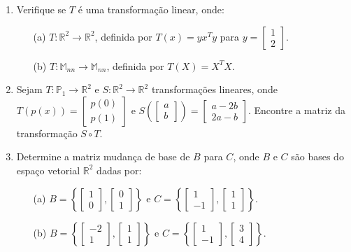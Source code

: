 \documentclass[a4paper,12pt]{article}
\begin{document}
\begin{enumerate}
\item Verifique se $T$ é uma transformação linear, onde:
\begin{enumerate}
    \item[(a)] $T: \mathbb{R}^2 \to \mathbb{R}^2$, definida por $T(x) = yx^Ty$ para $y = \begin{bmatrix} 1 \\ 2 \end{bmatrix}$.
    \item[(b)] $T: \mathbb{M}_{nn} \to \mathbb{M}_{nn}$, definida por $T(X) = X^TX$.
\end{enumerate}
\item Sejam $T: \mathbb{P}_1 \to \mathbb{R}^2$ e $S: \mathbb{R}^2 \to \mathbb{R}^2$ transformações lineares, onde $T(p(x)) = \begin{bmatrix} p(0) \\ p(1) \end{bmatrix}$ e $S\left(\begin{bmatrix} a \\ b \end{bmatrix}\right) = \begin{bmatrix} a - 2b \\ 2a - b \end{bmatrix}$. Encontre a matriz da transformação $S \circ T$.

\item Determine a matriz mudança de base de $B$ para $C$, onde $B$ e $C$ são bases do espaço vetorial $\mathbb{R}^2$ dadas por:
\begin{enumerate}
    \item [(a)] $B = \left\{ \begin{bmatrix} 1 \\ 0 \end{bmatrix}, \begin{bmatrix} 0 \\ 1 \end{bmatrix} \right\}$ e $C = \left\{ \begin{bmatrix} 1 \\ -1 \end{bmatrix}, \begin{bmatrix} 1 \\ 1 \end{bmatrix} \right\}$.
    \item [(b)] $B = \left\{ \begin{bmatrix} -2 \\ 1 \end{bmatrix}, \begin{bmatrix} 1 \\ 1 \end{bmatrix} \right\}$ e $C = \left\{ \begin{bmatrix} 1 \\ -1 \end{bmatrix}, \begin{bmatrix} 3 \\ 4 \end{bmatrix} \right\}$.
\end{enumerate}


\end{enumerate}
\end{document}

